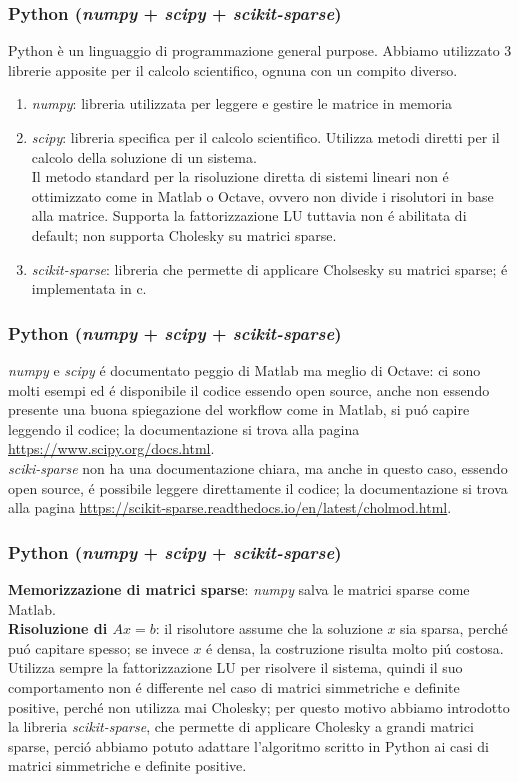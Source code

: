 \documentclass{beamer}
\begin{document}
\begin{frame}
\frametitle{Python (\textit{numpy} + \textit{scipy} + \textit{scikit-sparse})}
Python è un linguaggio di programmazione general purpose. Abbiamo utilizzato 3 librerie apposite per il calcolo scientifico, ognuna con un compito diverso.
\begin{enumerate}
\item \textit{numpy}: libreria utilizzata per leggere e gestire le matrice in memoria
\item \textit{scipy}: libreria specifica per il calcolo scientifico. Utilizza metodi diretti per il calcolo della soluzione di un sistema.\\
Il metodo standard per la risoluzione diretta di sistemi lineari non \'e ottimizzato come in Matlab o Octave, ovvero non divide i risolutori in base alla matrice. Supporta la fattorizzazione LU tuttavia non \'e abilitata di default; non supporta Cholesky su matrici sparse.
\item \textit{scikit-sparse}: libreria che permette di applicare Cholsesky su matrici sparse; \'e implementata in c.
\end{enumerate}
\end{frame}
\begin{frame}
\frametitle{Python (\textit{numpy} + \textit{scipy} + \textit{scikit-sparse})}
\textit{numpy} e \textit{scipy} \'e documentato peggio di Matlab ma meglio di Octave: ci sono molti esempi ed \'e disponibile il codice essendo open source, anche non essendo presente una buona spiegazione del workflow come in Matlab, si pu\'o capire leggendo il codice; la documentazione si trova alla pagina \url{https://www.scipy.org/docs.html}.\\ \textit{sciki-sparse} non ha una documentazione chiara, ma anche in questo caso, essendo open source, \'e possibile leggere direttamente il codice; la documentazione si trova alla pagina \url{https://scikit-sparse.readthedocs.io/en/latest/cholmod.html}.
\end{frame}
\begin{frame}
\frametitle{Python (\textit{numpy} + \textit{scipy} + \textit{scikit-sparse})}
\textbf{Memorizzazione di matrici sparse}: \textit{numpy} salva le matrici sparse come Matlab.\\
\textbf{Risoluzione di $Ax = b$}: il risolutore assume che la soluzione $x$ sia sparsa, perch\'e pu\'o capitare spesso; se invece $x$ \'e densa, la costruzione risulta molto pi\'u costosa. Utilizza sempre la fattorizzazione LU per risolvere il sistema, quindi il suo comportamento non \'e differente nel caso di matrici simmetriche e definite positive, perch\'e non utilizza mai Cholesky; per questo motivo abbiamo introdotto la libreria \textit{scikit-sparse}, che permette di applicare Cholesky a grandi matrici sparse, perci\'o abbiamo potuto adattare l'algoritmo scritto in Python ai casi di matrici simmetriche e definite positive.
\end{frame}
\end{document}
